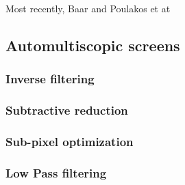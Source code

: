 Most recently, Baar and Poulakos et at \cite{van2011perceptually}


\subsection{Automultiscopic screens}
\subsubsection{Inverse filtering}
\subsubsection{Subtractive reduction}
\subsubsection{Sub-pixel optimization}
\subsubsection{Low Pass filtering}
